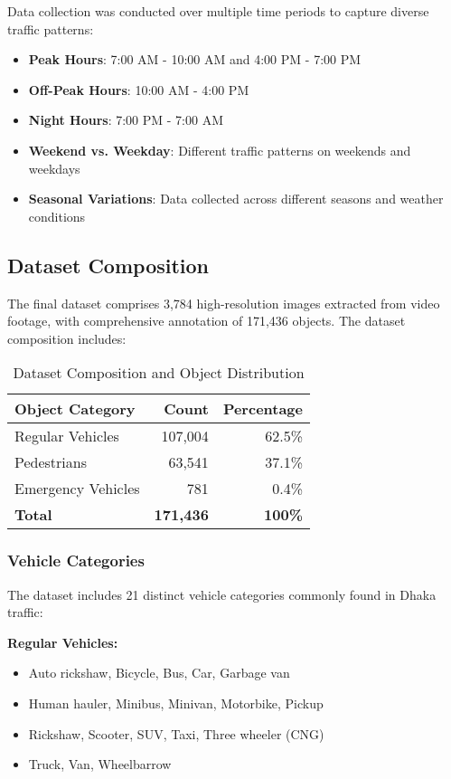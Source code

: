 Data collection was conducted over multiple time periods to capture diverse traffic patterns:

\begin{itemize}
    \item \textbf{Peak Hours}: 7:00 AM - 10:00 AM and 4:00 PM - 7:00 PM
    \item \textbf{Off-Peak Hours}: 10:00 AM - 4:00 PM
    \item \textbf{Night Hours}: 7:00 PM - 7:00 AM
    \item \textbf{Weekend vs. Weekday}: Different traffic patterns on weekends and weekdays
    \item \textbf{Seasonal Variations}: Data collected across different seasons and weather conditions
\end{itemize}

\subsection{Dataset Composition}

The final dataset comprises 3,784 high-resolution images extracted from video footage, with comprehensive annotation of 171,436 objects. The dataset composition includes:

\begin{table}[h]
\centering
\caption{Dataset Composition and Object Distribution}
\begin{tabular}{|l|r|r|}
\hline
\textbf{Object Category} & \textbf{Count} & \textbf{Percentage} \\
\hline
Regular Vehicles & 107,004 & 62.5\% \\
Pedestrians & 63,541 & 37.1\% \\
Emergency Vehicles & 781 & 0.4\% \\
\hline
\textbf{Total} & \textbf{171,436} & \textbf{100\%} \\
\hline
\end{tabular}
\end{table}

\subsubsection{Vehicle Categories}

The dataset includes 21 distinct vehicle categories commonly found in Dhaka traffic:

\textbf{Regular Vehicles:}
\begin{itemize}
    \item Auto rickshaw, Bicycle, Bus, Car, Garbage van
    \item Human hauler, Minibus, Minivan, Motorbike, Pickup
    \item Rickshaw, Scooter, SUV, Taxi, Three wheeler (CNG)
    \item Truck, Van, Wheelbarrow
\end{itemize}

